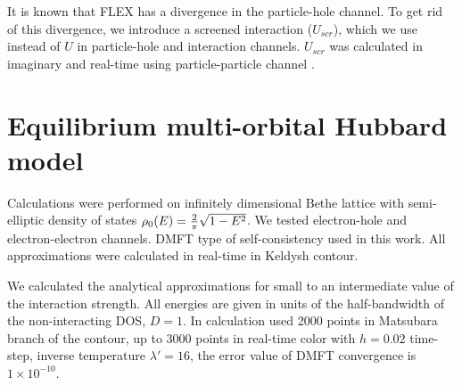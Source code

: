It is known that FLEX has a divergence in the particle-hole channel. To get rid of this divergence, we introduce a screened interaction ($U_{scr}$), which we use instead of $U$ in particle-hole and interaction channels. $U_{scr}$ was calculated in imaginary and real-time using particle-particle channel \citep{PhysRevB.72.115106,PhysRevB.92.195123,PhysRevLett.114.246402}.

\FloatBarrier

\section{Equilibrium multi-orbital Hubbard model}
\label{section:E_mb_Hubbard_model}
Calculations were performed on infinitely dimensional Bethe lattice with semi-elliptic density of states $\rho_0(E)={2 \over \pi}\sqrt{1-E^{2}}$.
We tested electron-hole and electron-electron channels. DMFT type of self-consistency used in this work. All approximations were calculated in real-time in Keldysh contour.

We calculated the analytical approximations for small to an intermediate value of the interaction strength. All energies are given in units of the half-bandwidth of the non-interacting DOS, $D = 1$. In calculation used 2000 points in Matsubara branch of the contour, up to 3000 points in real-time color with $h=0.02$ time-step, inverse temperature $\lambda'=16$, the error value of DMFT convergence is $1\times10^{-10}$.

